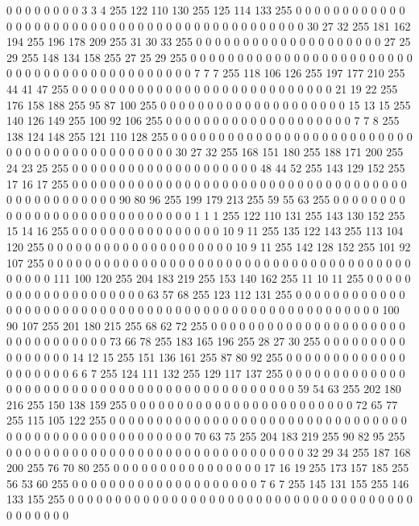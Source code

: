 0 0 0 0 0 0 0 0 3 3 4 255 122 110 130 255 125 114 133 255 0 0 0 0 0 0 0 0 0 0 0 0 0 0 0 0 0 0 0 0 0 0 0 0 0 0 0 0 0 0 0 0 0 0 0 0 0 0 0 0 0 0 0 0
30 27 32 255 181 162 194 255 196 178 209 255 31 30 33 255 0 0 0 0 0 0 0 0 0 0 0 0 0 0 0 0 0 0 0 0 27 25 29 255 148 134 158 255 27 25 29 255 0 0 0 0 0 0 0 0 0 0 0 0 0 0 0 0
0 0 0 0 0 0 0 0 0 0 0 0 0 0 0 0 0 0 0 0 0 0 0 0 0 0 0 0 7 7 7 255 118 106 126 255 197 177 210 255 44 41 47 255 0 0 0 0 0 0 0 0 0 0 0 0 0 0 0 0 0 0 0 0
0 0 0 0 0 0 0 0 21 19 22 255 176 158 188 255 95 87 100 255 0 0 0 0 0 0 0 0 0 0 0 0 0 0 0 0 0 0 0 0 15 13 15 255 140 126 149 255 100 92 106 255 0 0 0 0 0 0 0 0 0 0 0 0
0 0 0 0 0 0 0 0 7 7 8 255 138 124 148 255 121 110 128 255 0 0 0 0 0 0 0 0 0 0 0 0 0 0 0 0 0 0 0 0 0 0 0 0 0 0 0 0 0 0 0 0 0 0 0 0 0 0 0 0 0 0 0 0
30 27 32 255 168 151 180 255 188 171 200 255 24 23 25 255 0 0 0 0 0 0 0 0 0 0 0 0 0 0 0 0 0 0 0 0 48 44 52 255 143 129 152 255 17 16 17 255 0 0 0 0 0 0 0 0 0 0 0 0 0 0 0 0
0 0 0 0 0 0 0 0 0 0 0 0 0 0 0 0 0 0 0 0 0 0 0 0 0 0 0 0 0 0 0 0 90 80 96 255 199 179 213 255 59 55 63 255 0 0 0 0 0 0 0 0 0 0 0 0 0 0 0 0 0 0 0 0
0 0 0 0 0 0 0 0 1 1 1 255 122 110 131 255 143 130 152 255 15 14 16 255 0 0 0 0 0 0 0 0 0 0 0 0 0 0 0 0 10 9 11 255 135 122 143 255 113 104 120 255 0 0 0 0 0 0 0 0 0 0 0 0
0 0 0 0 0 0 0 0 10 9 11 255 142 128 152 255 101 92 107 255 0 0 0 0 0 0 0 0 0 0 0 0 0 0 0 0 0 0 0 0 0 0 0 0 0 0 0 0 0 0 0 0 0 0 0 0 0 0 0 0 0 0 0 0
111 100 120 255 204 183 219 255 153 140 162 255 11 10 11 255 0 0 0 0 0 0 0 0 0 0 0 0 0 0 0 0 0 0 0 0 63 57 68 255 123 112 131 255 0 0 0 0 0 0 0 0 0 0 0 0 0 0 0 0 0 0 0 0
0 0 0 0 0 0 0 0 0 0 0 0 0 0 0 0 0 0 0 0 0 0 0 0 0 0 0 0 0 0 0 0 100 90 107 255 201 180 215 255 68 62 72 255 0 0 0 0 0 0 0 0 0 0 0 0 0 0 0 0 0 0 0 0
0 0 0 0 0 0 0 0 0 0 0 0 73 66 78 255 183 165 196 255 28 27 30 255 0 0 0 0 0 0 0 0 0 0 0 0 0 0 0 0 14 12 15 255 151 136 161 255 87 80 92 255 0 0 0 0 0 0 0 0 0 0 0 0
0 0 0 0 0 0 0 0 6 6 7 255 124 111 132 255 129 117 137 255 0 0 0 0 0 0 0 0 0 0 0 0 0 0 0 0 0 0 0 0 0 0 0 0 0 0 0 0 0 0 0 0 0 0 0 0 0 0 0 0 0 0 0 0
59 54 63 255 202 180 216 255 150 138 159 255 0 0 0 0 0 0 0 0 0 0 0 0 0 0 0 0 0 0 0 0 0 0 0 0 72 65 77 255 115 105 122 255 0 0 0 0 0 0 0 0 0 0 0 0 0 0 0 0 0 0 0 0
0 0 0 0 0 0 0 0 0 0 0 0 0 0 0 0 0 0 0 0 0 0 0 0 0 0 0 0 0 0 0 0 70 63 75 255 204 183 219 255 90 82 95 255 0 0 0 0 0 0 0 0 0 0 0 0 0 0 0 0 0 0 0 0
0 0 0 0 0 0 0 0 0 0 0 0 32 29 34 255 187 168 200 255 76 70 80 255 0 0 0 0 0 0 0 0 0 0 0 0 0 0 0 0 17 16 19 255 173 157 185 255 56 53 60 255 0 0 0 0 0 0 0 0 0 0 0 0
0 0 0 0 0 0 0 0 7 6 7 255 145 131 155 255 146 133 155 255 0 0 0 0 0 0 0 0 0 0 0 0 0 0 0 0 0 0 0 0 0 0 0 0 0 0 0 0 0 0 0 0 0 0 0 0 0 0 0 0 0 0 0 0
